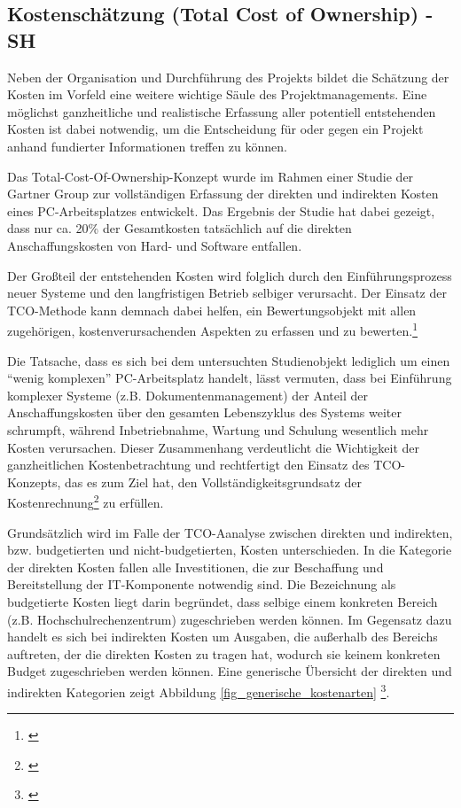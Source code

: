 
\subsection{Kostenschätzung (Total Cost of Ownership) - SH}

\label{subsection_kostenschatzung_TCO}
Neben der Organisation und Durchführung des Projekts bildet die Schätzung der Kosten im Vorfeld 
eine weitere wichtige Säule des Projektmanagements. Eine möglichst ganzheitliche und realistische 
Erfassung aller potentiell entstehenden Kosten ist dabei notwendig, um die Entscheidung für oder 
gegen ein Projekt anhand fundierter Informationen treffen zu können.

Das Total-Cost-Of-Ownership-Konzept wurde im Rahmen einer Studie der Gartner Group 
zur vollständigen Erfassung der direkten und indirekten Kosten eines PC-Arbeitsplatzes 
entwickelt. Das Ergebnis der Studie hat dabei gezeigt, dass nur ca. 20\% der Gesamtkosten 
tatsächlich auf die direkten Anschaffungskosten von Hard- und Software entfallen. 

Der Großteil der entstehenden Kosten wird folglich durch den Einführungsprozess neuer 
Systeme und den langfristigen Betrieb selbiger verursacht. Der Einsatz der TCO-Methode 
kann demnach dabei helfen, ein Bewertungsobjekt mit allen zugehörigen, 
kostenverursachenden Aspekten zu erfassen und zu bewerten.\footnote{\cite{hansen_business_2009}}

Die Tatsache, dass es sich bei dem untersuchten Studienobjekt lediglich um einen “wenig komplexen” PC-Arbeitsplatz handelt, lässt vermuten, dass bei Einführung komplexer Systeme (z.B. Dokumentenmanagement) der Anteil der Anschaffungskosten über den gesamten Lebenszyklus des Systems weiter schrumpft, während Inbetriebnahme, Wartung und Schulung wesentlich mehr Kosten verursachen. Dieser Zusammenhang verdeutlicht die Wichtigkeit der ganzheitlichen Kostenbetrachtung und rechtfertigt den Einsatz des TCO-Konzepts, das es zum Ziel hat, den Vollständigkeitsgrundsatz der Kostenrechnung\footnote{\cite{grob_einfuhrung_2004}} zu erfüllen.

Grundsätzlich wird im Falle der TCO-Aanalyse zwischen direkten und indirekten, bzw. budgetierten und nicht-budgetierten, Kosten unterschieden. In die Kategorie der direkten Kosten fallen alle Investitionen, die zur Beschaffung und Bereitstellung der IT-Komponente notwendig sind. Die Bezeichnung als budgetierte Kosten liegt darin begründet, dass selbige einem konkreten Bereich (z.B. Hochschulrechenzentrum) zugeschrieben werden können. Im Gegensatz dazu handelt es sich bei indirekten Kosten um Ausgaben, die außerhalb des Bereichs auftreten, der die direkten Kosten zu tragen hat, wodurch sie keinem konkreten Budget zugeschrieben werden können. Eine generische Übersicht der direkten und indirekten Kategorien zeigt Abbildung \ref{fig_generische_kostenarten} \footnote{\cite{hansen_business_2009}}.

